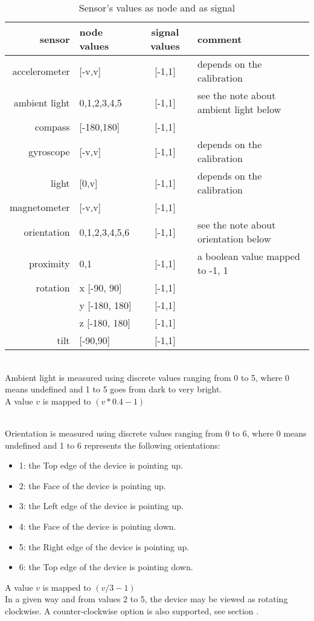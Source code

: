 \begin{table*}[htbp]
\begin{center}
\begin{tabular}{rlcl}
\hline
sensor & node values	&	signal values 	&  comment \\
\hline
accelerometer	& [-v,v]				& [-1,1] 		& depends on the calibration\\
ambient light	& {0,1,2,3,4,5}		& [-1,1] 		& see the note about ambient light below\\
compass			& [-180,180]		& [-1,1] 		& \\
gyroscope		& [-v,v]			& [-1,1] 		& depends on the calibration		\\
light			& [0,v]				& [-1,1] 		& depends on the calibration		\\
magnetometer	& [-v,v]			& [-1,1] 		& \\
orientation		& {0,1,2,3,4,5,6}	& [-1,1] 		& see the note about orientation below\\
proximity		& {0,1}				& [-1,1] 		& a boolean value mapped to -1, 1 \\
rotation		& x [-90, 90]		& [-1,1] 		& \\
				& y [-180, 180]		& [-1,1] 		& \\
				& z [-180, 180]		& [-1,1] 		& \\
tilt			& [-90,90] 			& [-1,1] 		& \\
\hline
\end{tabular}
\end{center}
\label{tab:sensorsval}
\caption{Sensor's values as node and as signal}
\end{table*}


\\
Ambient light is measured using discrete values ranging from 0 to 5, where 0 means undefined and 1 to 5 goes from dark to very bright. \\
A value $v$ is mapped to $(v * 0.4 - 1)$

\\
Orientation is measured using discrete values ranging from 0 to 6, where 0 means undefined and 1 to 6 represents the following orientations:
\begin{itemize}
\item 1: the Top edge of the device is pointing up.
\item 2: the Face of the device is pointing up.
\item 3: the Left edge of the device is pointing up. 
\item 4: the Face of the device is pointing down.
\item 5: the Right edge of the device is pointing up.
\item 6: the Top edge of the device is pointing down.
\end{itemize}
A value $v$ is mapped to $(v / 3 - 1)$\\
In a given way and from values 2 to 5, the device may be viewed as rotating clockwise. A counter-clockwise option is also supported, see section .


